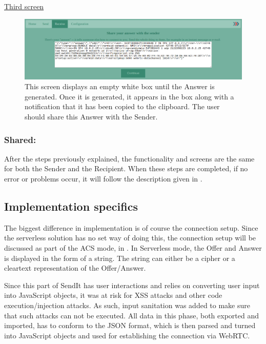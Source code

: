 %
\noindent
\underline{Third screen}
\begin{figure}[H]
  \centering
  \includegraphics[width=\textwidth]{Figures/SL/answer}
  \decoRule
  \caption[Serverless mode: Display Answer screen]{This screen displays an empty white box until the Answer is generated. Once it is generated, it appears in the box along with a notification that it has been copied to the clipboard. The user should share this Answer with the Sender.}
  \label{fig:serv_r_ans}
\end{figure}

\subsubsection*{Shared:}
After the steps previously explained, the functionality and screens are the same for both the Sender and the Recipient. When these steps are completed, if no error or problems occur, it will follow the description given in .
%

\subsection{Implementation specifics}
%
The biggest difference in implementation is of course the connection setup. Since the serverless solution has no set way of doing this, the connection setup will be discussed as part of the ACS mode, in . In Serverless mode, the Offer and Answer is displayed in the form of a string. The string can either be a cipher or a cleartext representation of the Offer/Answer.

Since this part of SendIt has user interactions and relies on converting user input into JavaScript objects, it was at risk for XSS attacks and other code execution/injection attacks. As such, input sanitation was added to make sure that such attacks can not be executed. All data in this phase, both exported and imported, has to conform to the JSON format, which is then parsed and turned into JavaScript objects and used for establishing the connection via WebRTC.
%
